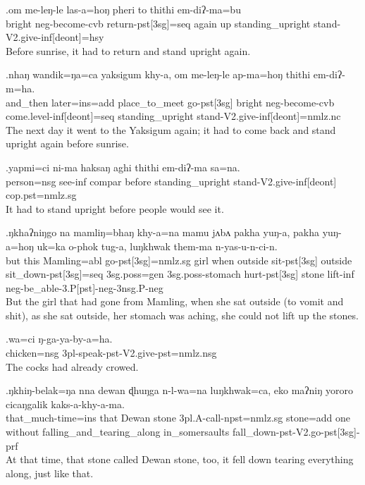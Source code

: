 \exg.om me-leŋ-le las-a=hoŋ   pheri to  thithi  em-diʔ-ma=bu\\
bright {\sc neg-}become{\sc -cvb} return{\sc -pst[3sg]=seq}  again up  standing\_upright stand{\sc -V2.give-inf[deont]=hsy}\\
Before sunrise, it had to return and stand  upright again.

\exg.nhaŋ  wandik=ŋa=ca  yaksigum  khy-a, om me-leŋ-le ap-ma=hoŋ   thithi  em-diʔ-m=ha.\\
and\_then later{\sc =ins=add} place\_to\_meet go{\sc -pst[3sg]}  bright {\sc neg-}become{\sc -cvb} come{\sc .level-inf[deont]=seq} standing\_upright  stand{\sc -V2.give-inf[deont]=nmlz.nc}\\
The next day it went to the Yaksigum again; it had to come back and stand upright again before sunrise.

\exg.yapmi=ci ni-ma haksaŋ aghi thithi  em-diʔ-ma    sa=na.\\
person{\sc =nsg} see{\sc -inf} {\sc compar} before standing\_upright stand{\sc -V2.give-inf[deont]} {\sc cop.pst=nmlz.sg}\\
It had to stand upright before people would see it.

\exg.ŋkhaʔniŋgo na mamliŋ=bhaŋ khy-a=na   mamu jʌbʌ pakha yuŋ-a, pakha yuŋ-a=hoŋ  uk=ka  o-phok   tug-a, luŋkhwak them-ma n-yas-u-n-ci-n.\\
but   this Mamling{\sc =abl} go{\sc -pst[3sg]=nmlz.sg} girl when outside sit{\sc -pst[3sg]} outside sit\_down{\sc -pst[3sg]=seq}  {\sc 3sg.poss=gen} {\sc 3sg.poss-}stomach hurt{\sc -pst[3sg]} stone lift{\sc -inf} {\sc neg-}be\_able{\sc -3.P[pst]-neg-3nsg.P-neg}\\
But the girl that had gone from Mamling, when she sat outside (to vomit and shit), as she sat outside, her stomach was aching, she could not lift up the stones.

\exg.wa=ci ŋ-ga-ya-by-a=ha.\\
chicken{\sc =nsg} {\sc 3pl-}speak{\sc -pst-V2.give-pst=nmlz.nsg}\\
The cocks had already crowed.

\exg.ŋkhiŋ-belak=ŋa nna  dewan  ɖhuŋga n-l-wa=na   luŋkhwak=ca, eko maʔniŋ yororo    cicaŋgalik   kaks-a-khy-a-ma.\\
that\_much-time{\sc =ins} that Dewan stone  {\sc 3pl.A-}call{\sc -npst=nmlz.sg} stone{\sc =add} one without  falling\_and\_tearing\_along in\_somersaults fall\_down{\sc -pst-V2.go-pst[3sg]-prf}\\
At that time, that stone called Dewan stone, too, it fell down tearing everything along, just like that.

